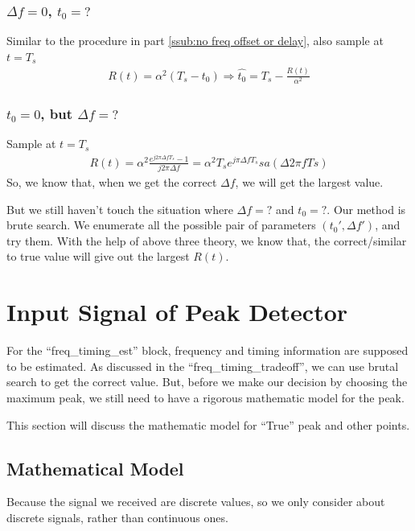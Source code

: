 \documentclass[a4paper]{article}
\begin{document}
\subsubsection{$\Delta f = 0$, $t_0 = ?$} %
\label{ssub:no freq offset, but delay is unknown}
Similar to the procedure in part \ref{ssub:no freq offset or delay}, also sample at $t = T_s$
\begin{align}
	R(t) = \alpha^2(T_s-t_0) \Rightarrow \hat{t_0} = T_s - \frac{R(t)}{\alpha^2}
\end{align}

\subsubsection{$t_0 = 0$, but $\Delta f = ?$} %
\label{ssub:no delay, but freq offset is unknown}
Sample at $t = T_s$
\begin{align}
	R(t) = \alpha^2 \frac{e^{j 2\pi \Delta f T_s} - 1}{j 2\pi \Delta f} = \alpha^2 T_s e^{j \pi \Delta f T_s} sa(\Delta 2 \pi f Ts)
\end{align}
So, we know that, when we get the correct $\Delta f$, we will get the largest value. 

But we still haven't touch the situation where $\Delta f = ?$ and $t_0 = ?$. Our method is brute search.
We enumerate all the possible pair of parameters $(t_0', \Delta f')$, and try them. With the help of above three theory, we know that, the correct/similar to true value will give out the largest $R(t)$.

\section{Input Signal of Peak Detector} %
\label{sec:input_signal_of_peak_detector}
For the ``freq\_timing\_est'' block, frequency and timing information are supposed to be estimated. As discussed in the ``freq\_timing\_tradeoff'', we can use brutal search to get the correct value. But, before we make our decision by choosing the maximum peak, we still need to have a rigorous mathematic model for the peak. 

This section will discuss the mathematic model for ``True'' peak and other points.


\subsection{Mathematical Model} %
\label{sub:mathematical_model}
Because the signal we received are discrete values, so we only consider about discrete signals, rather than continuous ones.
\end{document}

